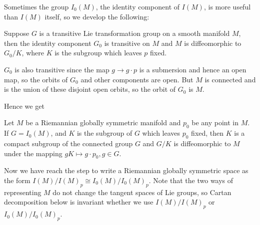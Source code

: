 Sometimes the group $I_0(M)$, the identity component of $I(M)$,
is more useful than $I(M)$ itself, so we develop the following:

\begin{lemma}
	Suppose $G$ is a transitive Lie transformation group on a
	smooth manifold $M$, then the identity component $G_0$ is
	transitive on $M$ and $M$ is diffeomorphic to $G_0/K$, where
	$K$ is the subgroup which leaves $p$ fixed.
\end{lemma}
\bproof
$G_0$ is also transitive since the map $g \to g \cdot p$ is a
submersion and hence an open map, so the orbits of $G_0$ and
other components are open. But $M$ is connected and is the union
of these disjoint open orbits, so the orbit of $G_0$ is $M$. 
\eproof

Hence we get
\begin{corollary}
	Let $M$ be a Riemannian globally symmetric manifold and $p_0$
	be any point in $M$. If $G = I_0(M)$, and $K$ is the subgroup
	of $G$ which leaves $p_0$ fixed, then $K$ is a compact
	subgroup of the connected group $G$ and $G/K$ is
	diffeomorphic to $M$ under the mapping $gK \mapsto g \cdot
	p_0, g \in G$.
\end{corollary}

Now we have reach the step to write a Riemannian globally
symmetric space as the form $I(M)/I(M)_p \cong I_0(M)/I_0(M)_p$.
Note that the two ways of representing $M$ do not change the
tangent spaces of Lie groups, so Cartan decomposition below is
invariant whether we use $I(M)/I(M)_p$ or $ I_0(M)/I_0(M)_p$.


